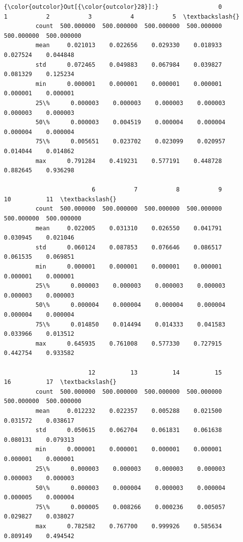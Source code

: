 \documentclass[11pt]{article}
\begin{document}
\begin{Verbatim}[commandchars=\\\{\}]
{\color{outcolor}Out[{\color{outcolor}28}]:}                 0           1           2           3           4           5  \textbackslash{}
         count  500.000000  500.000000  500.000000  500.000000  500.000000  500.000000   
         mean     0.021013    0.022656    0.029330    0.018933    0.027524    0.044848   
         std      0.072465    0.049883    0.067984    0.039827    0.081329    0.125234   
         min      0.000001    0.000001    0.000001    0.000001    0.000001    0.000001   
         25\%      0.000003    0.000003    0.000003    0.000003    0.000003    0.000003   
         50\%      0.000003    0.004519    0.000004    0.000004    0.000004    0.000004   
         75\%      0.005651    0.023702    0.023099    0.020957    0.014044    0.014862   
         max      0.791284    0.419231    0.577191    0.448728    0.882645    0.936298   
         
                         6           7           8           9          10          11  \textbackslash{}
         count  500.000000  500.000000  500.000000  500.000000  500.000000  500.000000   
         mean     0.022005    0.031310    0.026550    0.041791    0.030945    0.021046   
         std      0.060124    0.087853    0.076646    0.086517    0.061535    0.069851   
         min      0.000001    0.000001    0.000001    0.000001    0.000001    0.000001   
         25\%      0.000003    0.000003    0.000003    0.000003    0.000003    0.000003   
         50\%      0.000004    0.000004    0.000004    0.000004    0.000004    0.000004   
         75\%      0.014850    0.014494    0.014333    0.041583    0.033966    0.013512   
         max      0.645935    0.761008    0.577330    0.727915    0.442754    0.933582   
         
                        12          13          14          15          16          17  \textbackslash{}
         count  500.000000  500.000000  500.000000  500.000000  500.000000  500.000000   
         mean     0.012232    0.022357    0.005288    0.021500    0.031572    0.038617   
         std      0.050615    0.062704    0.061831    0.061638    0.080131    0.079313   
         min      0.000001    0.000001    0.000001    0.000001    0.000001    0.000001   
         25\%      0.000003    0.000003    0.000003    0.000003    0.000003    0.000003   
         50\%      0.000003    0.000004    0.000003    0.000004    0.000005    0.000004   
         75\%      0.000005    0.008266    0.000236    0.005057    0.029827    0.038027   
         max      0.782582    0.767700    0.999926    0.585634    0.809149    0.494542   
         

\end{Verbatim}
\end{document}
